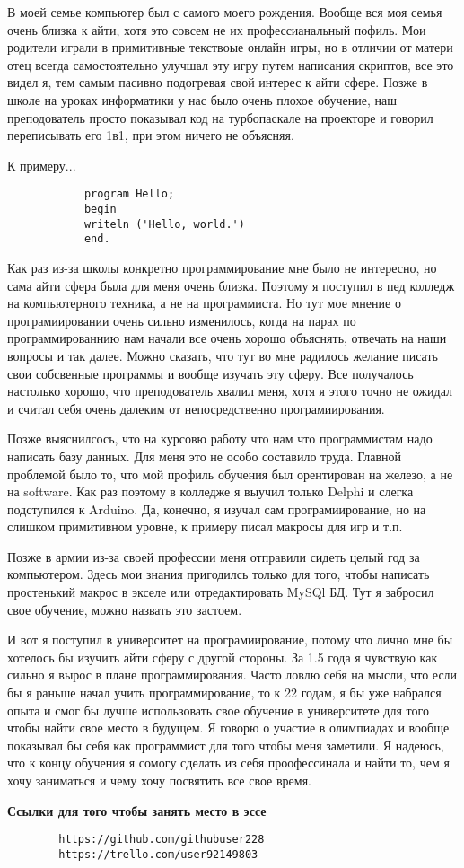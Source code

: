 В моей семье компьютер был с самого моего рождения. Вообще вся моя семья очень близка к айти, хотя это совсем не их профессианальный пофиль. Мои родители играли в примитивные текствоые онлайн игры, но в отличии от матери отец всегда самостоятельно улучшал эту игру путем написания скриптов, все это видел я, тем самым пасивно подогревая свой интерес к айти сфере. 
		Позже в школе на уроках информатики у нас было очень плохое обучение, наш преподователь просто показывал код на турбопаскале на проекторе и говорил переписывать его 1в1, при этом ничего не объясняя. 
		
		К примеру...
		\begin{verbatim}
			program Hello;
			begin
			writeln ('Hello, world.')
			end.
		\end{verbatim}

		Как раз из-за школы конкретно программирование мне было не интересно, но сама айти сфера была для меня очень близка. Поэтому я поступил в пед колледж на компьютерного техника, а не на программиста. Но тут мое мнение о програмиировании очень сильно изменилось, когда на парах по программированнию нам начали все очень хорошо объяснять, отвечать на наши вопросы и так далее. Можно сказать, что тут во мне радилось желание писать свои собсвенные программы и вообще изучать эту сферу. Все получалось настолько хорошо, что преподователь хвалил меня, хотя я этого точно не ожидал и считал себя очень далеким от непосредственно програмиирования.
		
		Позже выяснилсось, что на курсовю работу что нам что программистам надо написать базу данных. Для меня это не особо составило труда. Главной проблемой было то, что мой профиль обучения был орентирован на железо, а не на software. Как раз поэтому в колледже я выучил только Delphi и слегка подступился к Arduino. Да, конечно, я изучал сам програмиирование, но на слишком примитивном уровне, к примеру писал макросы для игр и т.п. 
		
		Позже в армии из-за своей профессии меня отправили сидеть целый год за компьютером. Здесь мои знания пригодилсь только для того, чтобы написать простенький макрос в экселе или отредактировать MySQl БД. Тут я забросил свое обучение, можно назвать это застоем.
		
		И вот я поступил в университет на програмиирование, потому что лично мне бы хотелось бы изучить айти сферу с другой стороны. За 1.5 года я чувствую как сильно я вырос в плане программирования. Часто ловлю себя на мысли, что если бы я раньше начал учить программирование, то к 22 годам, я бы уже набрался опыта и смог бы лучше использовать свое обучение в университете для того чтобы найти свое место в будущем. Я говорю о участие в олимпиадах и вообще показывал бы себя как программист для того чтобы меня заметили. Я надеюсь, что к концу обучения я сомогу сделать из себя проофессинала и найти то, чем я хочу заниматься и чему хочу посвятить все свое время.
		
		\noindent \textbf{Ссылки для того чтобы занять место в эссе}
		\begin{verbatim}
		https://github.com/githubuser228
		https://trello.com/user92149803
		\end{verbatim}